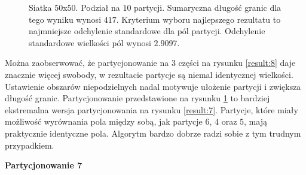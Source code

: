 \begin{figure}[h]
\begin{subfigure}{.33\textwidth}
    \caption[short]{}
\end{subfigure}
\caption{Siatka $50$x$50$. Podział na $10$ partycji. Sumaryczna długość granic dla tego wyniku wynosi $417$.
Kryterium wyboru najlepszego rezultatu to najmniejsze odchylenie standardowe dla pól partycji.
Odchylenie standardowe wielkości pól wynosi $2.9097$.}
\label{result:9}
\end{figure}
\FloatBarrier
Można zaobserwować, że partycjonowanie na $3$ części na rysunku \ref{result:8} daje znacznie więcej swobody, w rezultacie
partycje są niemal identycznej wielkości.
Ustawienie obszarów niepodzielnych nadal motywuje ułożenie partycji i zwiększa długość granic.
Partycjonowanie przedstawione na rysunku \ref{result:9} to bardziej ekstremalna wersja partycjonowania na rysunku \ref{result:7}.
Partycje, które miały możliwość wyrównania pola między sobą, jak partycje $6$, $4$ oraz $5$,
mają praktycznie identyczne pola.
Algorytm bardzo dobrze radzi sobie z tym trudnym przypadkiem.

\vspace{3mm}
\textbf{Partycjonowanie 7}
\vspace{1mm}

